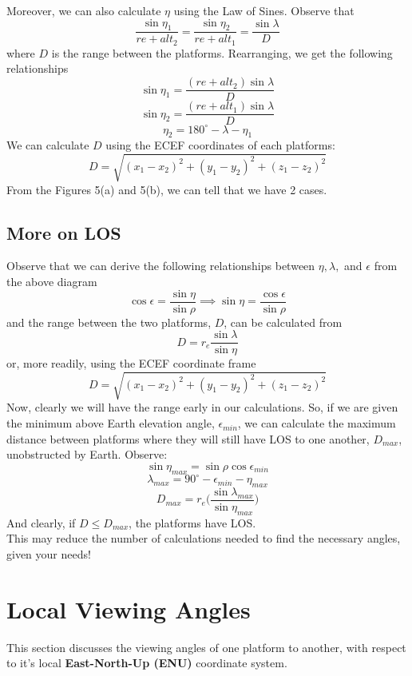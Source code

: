 \documentclass{article}
\begin{document}
Moreover, we can also calculate $\eta$ using the Law of Sines. Observe that 
$$\frac{\sin\eta_1}{re+alt_2} = \frac{\sin\eta_2}{re+alt_1} = \frac{\sin\lambda}{D}$$
where $D$ is the range between the platforms. Rearranging, we get the following relationships
$$\sin\eta_1 = \frac{(re+alt_2)\sin\lambda}{D}$$
$$\sin\eta_2 = \frac{(re+alt_1)\sin\lambda}{D}$$
$$\eta_2 = 180^{\circ}-\lambda-\eta_1$$
We can calculate $D$ using the ECEF coordinates of each platforms:
$$D = \sqrt{(x_1-x_2)^2+(y_1-y_2)^2+(z_1-z_2)^2}$$
From the Figures 5(a) and 5(b), we can tell that we have 2 cases. \\


\subsection*{More on LOS}
Observe that we can derive the following relationships between $\eta, \lambda,$ and $\epsilon$ from the 
above diagram
$$\cos\epsilon = \frac{\sin\eta}{\sin\rho} \implies \sin\eta = \frac{\cos\epsilon}{\sin\rho}$$
and the range between the two platforms, $D$, can be calculated from
$$D = r_e\frac{\sin\lambda}{\sin\eta}$$
or, more readily, using the ECEF coordinate frame
$$D = \sqrt{(x_1-x_2)^2+(y_1-y_2)^2+(z_1-z_2)^2}$$
Now, clearly we will have the range early in our calculations. So,
if we are given the minimum above Earth elevation angle, $\epsilon_{min}$, we can calculate the maximum distance
between platforms where they will still have LOS to one another, $D_{max}$, unobstructed by Earth. Observe:
$$\sin\eta_{max} = \sin\rho\cos\epsilon_{min}$$
$$\lambda_{max} = 90^{\circ}-\epsilon_{min} - \eta_{max}$$
$$D_{max} = r_e\Biggl( \frac{\sin\lambda_{max}}{\sin\eta_{max}}\Biggr)$$
And clearly, if $D \leq D_{max}$, the platforms have LOS.\\
This may reduce the number of calculations needed to find the necessary angles, given your needs!

\section*{Local Viewing Angles}
This section discusses the viewing angles of one platform to another, with respect to it's local 
\textbf{East-North-Up (ENU)} coordinate system.
\end{document}
